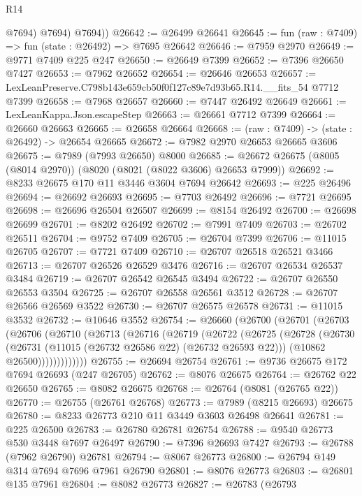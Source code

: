 \begin{lexlean}{R14}
\begin{coremodule}
            @7694)
          @7694)
        @7694))
@26642 := @26499 @26641
@26645 := fun (raw : @7409) => fun (state : @26492) => @7695 @26642
@26646 := @7959 @2970
@26649 := @9771 @7409 @225 @247
@26650 := @26649 @7399
@26652 := @7396 @26650 @7427
@26653 := @7962 @26652
@26654 := @26646 @26653
@26657 := LexLeanPreserve.C798b143e659cb50f0f127c89e7d93b65.R14.__fits_54 @7712 @7399
@26658 := @7968 @26657
@26660 := @7447 @26492 @26649
@26661 := LexLeanKappa.Json.escapeStep
@26663 := @26661 @7712 @7399
@26664 := @26660 @26663
@26665 := @26658 @26664
@26668 := (raw : @7409) -> (state : @26492) -> @26654 @26665
@26672 := @7982 @2970 @26653 @26665 @3606
@26675 := @7989 (@7993 @26650) @8000
@26685 := @26672 @26675 (@8005 (@8014 @2970)) (@8020 (@8021 (@8022 @3606) @26653 @7999))
@26692 := @8233 @26675 @170 @11 @3446 @3604 @7694 @26642
@26693 := @225 @26496
@26694 := @26692 @26693
@26695 := @7703 @26492
@26696 := @7721 @26695
@26698 := @26696 @26504 @26507
@26699 := @8154 @26492
@26700 := @26698 @26699
@26701 := @8202 @26492
@26702 := @7991 @7409
@26703 := @26702 @26511
@26704 := @9752 @7409
@26705 := @26704 @7399
@26706 := @11015 @26705
@26707 := @7721 @7409
@26710 := @26707 @26518 @26521 @3466
@26713 := @26707 @26526 @26529 @3476
@26716 := @26707 @26534 @26537 @3484
@26719 := @26707 @26542 @26545 @3494
@26722 := @26707 @26550 @26553 @3504
@26725 := @26707 @26558 @26561 @3512
@26728 := @26707 @26566 @26569 @3522
@26730 := @26707 @26575 @26578
@26731 := @11015 @3532
@26732 := @10646 @3552
@26754 := @26660
    (@26700
      (@26701
        (@26703
          (@26706
            (@26710
              (@26713
                (@26716
                  (@26719
                    (@26722
                      (@26725
                        (@26728
                          (@26730
                            (@26731 (@11015 (@26732 @26586 @22) (@26732 @26593 @22)))
                            (@10862 @26500)))))))))))))
@26755 := @26694 @26754
@26761 := @9736 @26675 @172 @7694 @26693 (@247 @26705)
@26762 := @8076 @26675
@26764 := @26762 @22 @26650
@26765 := @8082 @26675
@26768 := @26764 (@8081 (@26765 @22))
@26770 := @26755 (@26761 @26768)
@26773 := @7989 (@8215 @26693) @26675
@26780 := @8233 @26773 @210 @11 @3449 @3603 @26498 @26641
@26781 := @225 @26500
@26783 := @26780 @26781 @26754
@26788 := @9540 @26773 @530 @3448 @7697 @26497
@26790 := @7396 @26693 @7427
@26793 := @26788 (@7962 @26790) @26781
@26794 := @8067 @26773
@26800 := @26794 @149 @314 @7694 @7696 @7961 @26790
@26801 := @8076 @26773
@26803 := @26801 @135 @7961
@26804 := @8082 @26773
@26827 := @26783
    (@26793

\end{coremodule}
\end{lexlean}
